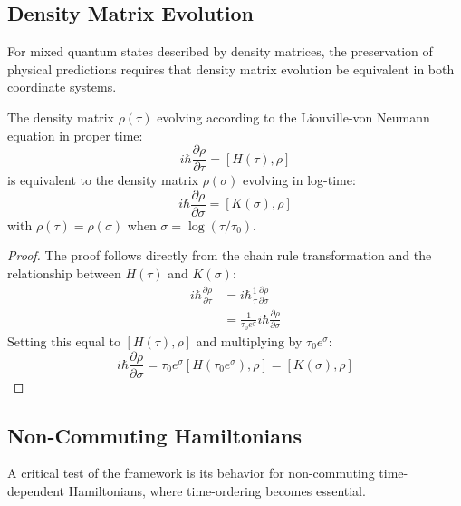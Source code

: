 \subsection{Density Matrix Evolution}
\label{subsec:density_matrix}

For mixed quantum states described by density matrices, the preservation of physical predictions requires that density matrix evolution be equivalent in both coordinate systems.

\begin{theorem}
\label{thm:density_matrix_equivalence}
The density matrix $\rho(\tau)$ evolving according to the Liouville-von Neumann equation in proper time:
\begin{equation}
i\hbar \frac{\partial \rho}{\partial \tau} = [H(\tau), \rho]
\end{equation}
is equivalent to the density matrix $\rho(\sigma)$ evolving in log-time:
\begin{equation}
i\hbar \frac{\partial \rho}{\partial \sigma} = [K(\sigma), \rho]
\label{eq:density_matrix_evolution}
\end{equation}
with $\rho(\tau) = \rho(\sigma)$ when $\sigma = \log(\tau/\tau_0)$.
\end{theorem}

\begin{proof}
The proof follows directly from the chain rule transformation and the relationship between $H(\tau)$ and $K(\sigma)$:
\begin{align}
i\hbar \frac{\partial \rho}{\partial \tau} &= i\hbar \frac{1}{\tau} \frac{\partial \rho}{\partial \sigma} \\
&= \frac{1}{\tau_0 e^\sigma} i\hbar \frac{\partial \rho}{\partial \sigma}
\end{align}
Setting this equal to $[H(\tau), \rho]$ and multiplying by $\tau_0 e^\sigma$:
\begin{equation}
i\hbar \frac{\partial \rho}{\partial \sigma} = \tau_0 e^\sigma [H(\tau_0 e^\sigma), \rho] = [K(\sigma), \rho]
\end{equation}
\end{proof}

\subsection{Non-Commuting Hamiltonians}
\label{subsec:noncommuting_hamiltonians}

A critical test of the framework is its behavior for non-commuting time-dependent Hamiltonians, where time-ordering becomes essential.


